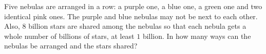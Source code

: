 Five nebulas are arranged in a row: a purple one, a blue one, a green one and two identical pink ones. The purple and blue nebulas may not be next to each other. Also, $8$ billion stars are shared among the nebulas so that each nebula gets a whole number of billions of stars, at least $1$ billion. In how many ways can the nebulas be arranged and the stars shared?
